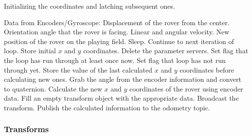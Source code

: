 \documentclass{article}
\begin{document}
          \begin{algorithm}[H]
          \caption[Odometry Node Initialization]{Initializing the coordinates and latching subsequent ones.}
          \label{alg:init_coordinates}
          \begin{algorithmic}[1]
               \REQUIRE Data from Encoders/Gyroscope: Displacement of the rover from the center. Orientation angle that the rover is facing. Linear and angular velocity.
               \ENSURE New position of the rover on the playing field.
                         \STATE Sleep.
                         \STATE Continue to next iteration of loop.
                    \ENDWHILE
                    \STATE Store initial $x$ and $y$ coordinates.
                         \STATE Delete the parameter servers.
                         \STATE Set flag that the loop has run through at least once now.
                    \ELSE
                    \STATE Set flag that loop has not run through yet.
                    \ENDIF
               \ELSE
               \STATE Store the value of the last calculated $x$ and $y$ coordinates before calculating new ones.
               \STATE Grab the angle from the encoder information and convert to quaternion.
               \STATE Calculate the new $x$ and $y$ coordinates of the rover using encoder data.
               \STATE Fill an empty transform object with the appropriate data.
               \STATE Broadcast the transform.
               \STATE Publish the calculated information to the odometry topic.
               \ENDIF
          \end{algorithmic}
          \end{algorithm}
          \subsubsection{Transforms}
\end{document}
